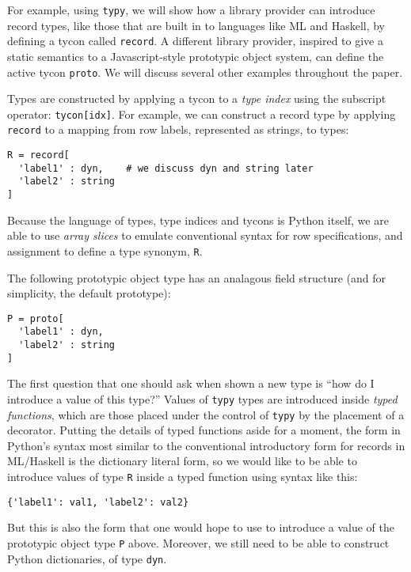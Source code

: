 \documentclass{sigplanconf}
\newcommand{\lip}[1]{\lstinline[language=Python,basicstyle=\ttfamily\small,deletendkeywords={tuple,buffer,map}]{#1}}
\begin{document}
For example, using \lip{typy}, we will show how a library provider can introduce record types, like those that are built in to languages like ML and Haskell, by defining a tycon called \lip{record}. A different library provider, inspired to give a static semantics to a Javascript-style prototypic object system, can define the active tycon \lip{proto}. We will discuss several other examples throughout the paper.

Types are constructed by applying a tycon to a \emph{type index} using the subscript operator: \lip{tycon[idx]}. For example, we can construct a record type by applying \lip{record} to a mapping from row labels, represented as strings, to types:
\begin{lstlisting}[numbers=none]
R = record[
  'label1' : dyn,    # we discuss dyn and string later
  'label2' : string
]
\end{lstlisting}
Because the language of types, type indices and tycons is Python itself, we are able to use \emph{array slices} to emulate conventional syntax for row specifications, and assignment to define a type synonym, \lip{R}.%

The following prototypic object type has an analagous field structure (and for simplicity, the default prototype):
\begin{lstlisting}[numbers=none]
P = proto[
  'label1' : dyn,   
  'label2' : string 
]
\end{lstlisting}

The first question that one should ask when shown a new type is ``how do I introduce a value of this type?'' Values of \lip{typy} types are introduced inside \emph{typed functions}, which are those placed under the control of \lip{typy} by the placement of a decorator. Putting the details of typed functions aside for a moment, the form in Python's syntax most similar to the conventional introductory form for records in ML/Haskell is the dictionary literal form, so we would like to be able to introduce values of type \lip{R} inside a typed function using syntax like this:
\begin{lstlisting}[numbers=none]
{'label1': val1, 'label2': val2} 
\end{lstlisting}
But this is also the form that one would hope to use to introduce a value of the prototypic object type \lip{P} above. Moreover, we still need to be able to construct Python dictionaries, of type \lip{dyn}. 
\end{document}
